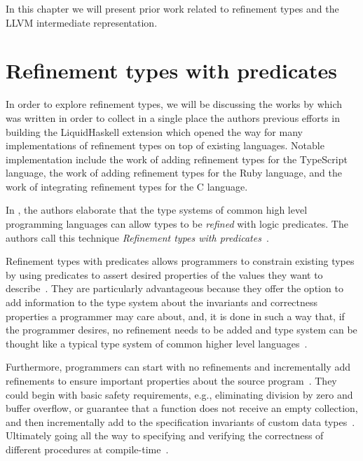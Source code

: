 \documentclass[
  oneside,
  english,
  coorientadorbanca,
  noabntexcite
]{ufsc-thesis-rn46-2019}
\begin{document}
In this chapter we will present prior work related to refinement types and the LLVM intermediate representation.

\section{Refinement types with predicates}

In order to explore refinement types, we will be discussing the works by \textcite{jhala2020tutorial} which was written in order to collect in a single place the authors previous efforts in \textcite{vazou2014liquidhaskell} building the LiquidHaskell extension  which opened the way for many implementations of refinement types on top of existing languages.
Notable implementation include the work of \textcite{vekris2016refinementtypescript} adding refinement types for the TypeScript language, the work of \textcite{vazou2018refinementruby} adding refinement types for the Ruby language, and the work of \textcite{sammler2021refinedc} integrating refinement types for the C language.

In \textcite{jhala2020tutorial}, the authors elaborate that the type systems of common high level programming languages can allow types to be \textit{refined} with logic predicates.
The authors call this technique \textit{Refinement types with predicates}~\cite{jhala2020tutorial}.

Refinement types with predicates allows programmers to constrain existing types by using predicates to assert desired properties of the values they want to describe~\cite{jhala2020tutorial}.
They are particularly advantageous because they offer the option to add information to the type system about the invariants and correctness properties a programmer may care about, and, it is done in such a way that, if the programmer desires, no refinement needs to be added and type system can be thought like a typical type system of common higher level languages~\cite{jhala2020tutorial}.

Furthermore, programmers can start with no refinements and incrementally add refinements to ensure important properties about the source program~\cite{jhala2020tutorial}.
They could begin with basic safety requirements, e.g., eliminating division by zero and buffer overflow, or guarantee that a function does not receive an empty collection, and then incrementally add to the specification invariants of custom data types~\cite{jhala2020tutorial}.
Ultimately going all the way to specifying and verifying the correctness of different procedures at compile-time~\cite{jhala2020tutorial}.
\end{document}
